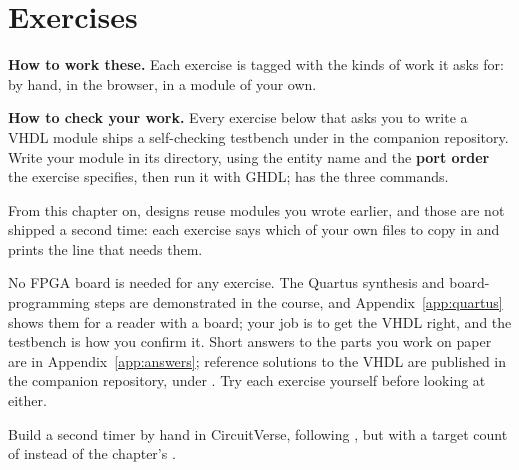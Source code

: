 
\section{Exercises}
\label{c7:sec:exercises}

\begin{aside}
\textbf{How to work these.} Each exercise is tagged with the kinds of work it asks for:
 by hand,  in the browser,  in a module of your own.

\textbf{How to check your work.} Every exercise below that asks you to write a VHDL module ships a
self-checking testbench under  in the companion repository. Write your
module in its  directory, using the entity name and the \textbf{port
order} the exercise specifies, then run it with GHDL;  has the three commands.

From this chapter on, designs reuse modules you wrote earlier, and those are not shipped a second
time: each exercise says which of your own files to copy in and prints the  line that
needs them.

No FPGA board is needed for any exercise. The Quartus synthesis and board-programming steps are
demonstrated in the course, and Appendix~\ref{app:quartus} shows them for a reader with a board;
your job is to get the VHDL right, and the testbench is how you confirm it. Short answers to the
parts you work on paper are in Appendix~\ref{app:answers}; reference solutions to the VHDL are
published in the companion repository, under . Try each exercise
yourself before looking at either.
\end{aside}

\label{c7:set:1}

\label{c7:ex:1}
Build a second timer by hand in CircuitVerse, following , but with a target count of
 instead of the chapter's .

